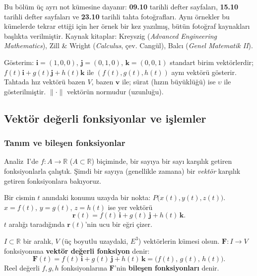 \begin{bilgi}
Bu bölüm üç ayrı not kümesine dayanır: \textbf{09.10} tarihli defter sayfaları, \textbf{15.10} tarihli defter sayfaları ve
\textbf{23.10} tarihli tahta fotoğrafları. Aynı örnekler bu kümelerde tekrar ettiği için her örnek bir kez yazılmış,
bütün fotoğraf kaynakları başlıkta verilmiştir. Kaynak kitaplar: Kreyszig (\emph{Advanced Engineering Mathematics}),
Zill \& Wright (\emph{Calculus}, çev. Cangül), Balcı (\emph{Genel Matematik II}).

Gösterim: $\mathbf i=(1,0,0)$, $\mathbf j=(0,1,0)$, $\mathbf k=(0,0,1)$ standart birim vektörlerdir;
$f(t)\mathbf i+g(t)\mathbf j+h(t)\mathbf k$ ile $(f(t),g(t),h(t))$ aynı vektörü gösterir. Tahtada hız vektörü bazen
$V$, bazen $\mathbf v$ ile; sürat (hızın büyüklüğü) ise $\upsilon$ ile gösterilmiştir. $\|\cdot\|$ vektörün normudur (uzunluğu).
\end{bilgi}

\subsection{Vektör değerli fonksiyonlar ve işlemler}

\subsubsection{Tanım ve bileşen fonksiyonlar}

Analiz~I'de $f:A\to\mathbb R$ ($A\subset\mathbb R$) biçiminde, bir sayıya bir sayı karşılık getiren fonksiyonlarla
çalıştık. Şimdi bir sayıya (genellikle zamana) bir \emph{vektör} karşılık getiren fonksiyonlara bakıyoruz.

\begin{tahta}
Bir cismin $t$ anındaki konumu uzayda bir nokta: $P\big(x(t),y(t),z(t)\big)$. $x=f(t)$, $y=g(t)$, $z=h(t)$ ise yer vektörü
\[ \mathbf r(t)=f(t)\,\mathbf i+g(t)\,\mathbf j+h(t)\,\mathbf k . \]
$t$ aralığı taradığında $\mathbf r(t)$'nin ucu bir eğri çizer.
\end{tahta}

\begin{tanim}
$I\subset\mathbb R$ bir aralık, $V$ (üç boyutlu uzaydaki, $E^3$) vektörlerin kümesi olsun. $\mathbf F:I\to V$ fonksiyonuna
\textbf{vektör değerli fonksiyon} denir:
\[ \mathbf F(t)=f(t)\,\mathbf i+g(t)\,\mathbf j+h(t)\,\mathbf k=\big(f(t),\,g(t),\,h(t)\big). \]
Reel değerli $f,g,h$ fonksiyonlarına $\mathbf F$'nin \textbf{bileşen fonksiyonları} denir.
\end{tanim}

